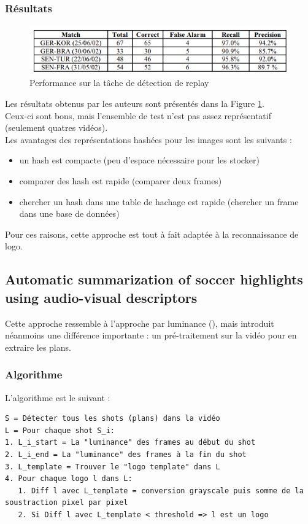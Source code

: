 \documentclass[11pt]{article}
\begin{document}
\subsubsection{Résultats}
\label{sec:org494aa92}
\begin{figure}[htbp]
\centering
\includegraphics[width=.9\linewidth]{mean_shift_res.png}
\caption{Performance sur la tâche de détection de replay \label{mean-shift-res}}
\end{figure}
Les résultats obtenus par les auteurs sont présentés dans la Figure \ref{mean-shift-res}.\\
Ceux-ci sont bons, mais l'ensemble de test n'est pas assez représentatif (seulement quatres vidéos).\\
Les avantages des représentations hashées pour les images sont les suivants :\\
\begin{itemize}
\item un hash est compacte (peu d'espace nécessaire pour les stocker)\\
\item comparer des hash est rapide (comparer deux frames)\\
\item chercher un hash dans une table de hachage est rapide (chercher un frame dans une base de données)\\
\end{itemize}
Pour ces raisons, cette approche est tout à fait adaptée à la reconnaissance de logo.\\

\subsection{Automatic summarization of soccer highlights using audio-visual descriptors}
\label{sec:orgc8c47da}
Cette approche \cite{Ravent_s_2015} ressemble à l'approche par luminance (\cite{xu11_robus_replay_detec_algor_soccer_video}), mais introduit néanmoins une différence importante : un pré-traitement sur la vidéo pour en extraire les plans.\\
\subsubsection{Algorithme}
\label{sec:orga39ba0d}
L'algorithme est le suivant :\\
\begin{verbatim}
S = Détecter tous les shots (plans) dans la vidéo
L = Pour chaque shot S_i:
1. L_i_start = La "luminance" des frames au début du shot
2. L_i_end = La "luminance" des frames à la fin du shot
3. L_template = Trouver le "logo template" dans L
4. Pour chaque logo l dans L:
   1. Diff l avec L_template = conversion grayscale puis somme de la soustraction pixel par pixel
   2. Si Diff l avec L_template < threshold => l est un logo
\end{verbatim}
\end{document}

